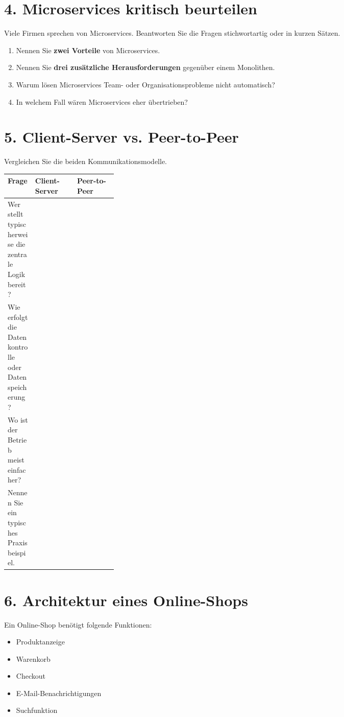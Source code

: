 \documentclass[11pt,a4paper]{article}
\begin{document}
\section*{4. Microservices kritisch beurteilen}
Viele Firmen sprechen von Microservices. Beantworten Sie die Fragen stichwortartig oder in kurzen Sätzen.

\begin{enumerate}
  \item Nennen Sie \textbf{zwei Vorteile} von Microservices.
  \item Nennen Sie \textbf{drei zusätzliche Herausforderungen} gegenüber einem Monolithen.
  \item Warum lösen Microservices Team- oder Organisationsprobleme nicht automatisch?
  \item In welchem Fall wären Microservices eher übertrieben?
\end{enumerate}

\section*{5. Client-Server vs. Peer-to-Peer}
Vergleichen Sie die beiden Kommunikationsmodelle.

\begin{tabularx}{\linewidth}{|>{\raggedright\arraybackslash}p{0.25\linewidth}|>{\raggedright\arraybackslash}X|>{\raggedright\arraybackslash}X|}
\hline
\textbf{Frage} & \textbf{Client-Server} & \textbf{Peer-to-Peer} \\
\hline
Wer stellt typischerweise die zentrale Logik bereit? & & \\[1.1cm] \hline
Wie erfolgt die Datenkontrolle oder Datenspeicherung? & & \\[1.1cm] \hline
Wo ist der Betrieb meist einfacher? & & \\[1.1cm] \hline
Nennen Sie ein typisches Praxisbeispiel. & & \\[1.1cm] \hline
\end{tabularx}

\section*{6. Architektur eines Online-Shops}
Ein Online-Shop benötigt folgende Funktionen:
\begin{itemize}
  \item Produktanzeige
  \item Warenkorb
  \item Checkout
  \item E-Mail-Benachrichtigungen
  \item Suchfunktion
\end{itemize}
\end{document}

